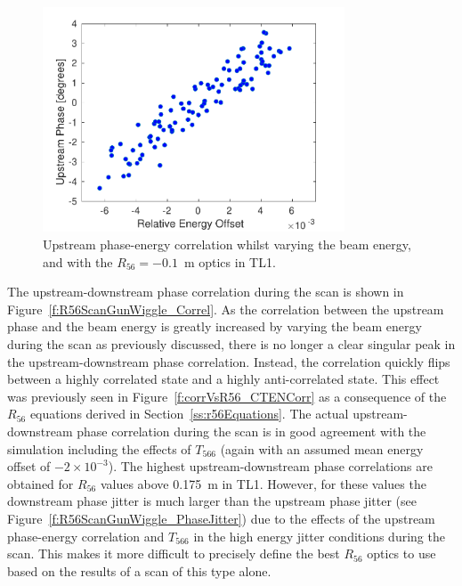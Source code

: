 \begin{figure}
  \centering
  \includegraphics[width=0.8\textwidth]{Figures/propagation/R56ScanGunWiggle_UpEnCorr}
  \caption{Upstream phase-energy correlation whilst varying the beam energy, and with the \(R_{56}=-0.1\)~m optics in TL1.}
  \label{f:R56ScanGunWiggle_UpEnCorr}
\end{figure}

The upstream-downstream phase correlation during the scan is shown in Figure~\ref{f:R56ScanGunWiggle_Correl}. As the correlation between the upstream phase and the beam energy is greatly increased by varying the beam energy during the scan as previously discussed, there is no longer a clear singular peak in the upstream-downstream phase correlation. Instead, the correlation quickly flips between a highly correlated state and a highly anti-correlated state. This effect was previously seen in Figure~\ref{f:corrVsR56_CTENCorr} as a consequence of the \(R_{56}\) equations derived in Section~\ref{ss:r56Equations}. The actual upstream-downstream phase correlation during the scan is in good agreement with the simulation including the effects of \(T_{566}\) (again with an assumed mean energy offset of \(-2\times10^{-3}\)). 
The highest upstream-downstream phase correlations are obtained for \(R_{56}\) values above 0.175~m in TL1.
However, for these values the downstream phase jitter is much larger than the upstream phase jitter (see Figure~\ref{f:R56ScanGunWiggle_PhaseJitter}) due to the effects of the upstream phase-energy correlation and \(T_{566}\) in the high energy jitter conditions during the scan. This makes it more difficult to precisely define the best \(R_{56}\) optics to use based on the results of a scan of this type alone.




